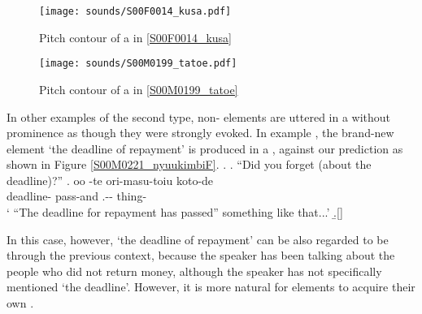 \begin{figure}
	\begin{center}
	\texttt{[image: sounds/S00F0014\_kusa.pdf]}
	\caption{Pitch contour of a in \ref{S00F0014_kusa}}
	\label{S00F0014_kusaF}
	\end{center}
\end{figure}
\begin{figure}
	\begin{center}
	\texttt{[image: sounds/S00M0199\_tatoe.pdf]}
	\caption{Pitch contour of a in \ref{S00M0199_tatoe}}
	\label{S00M0199_tatoeF}
	\end{center}
\end{figure}
%
In other examples of the second type,
non- elements are uttered in a  without prominence
as though they were strongly evoked.
In example \Next,
the brand-new element  `the deadline of repayment' is produced in a , against our prediction
as shown in Figure \ref{S00M0221_nyuukimbiF}.
%
\ex.\label{S00M0221_nyuukimbi}
 \a. ``Did you forget (about the deadline)?''
 \bg. oo \tp{\dvline}  \tp{\dvline} -te ori-masu-toiu koto-de \tp{\dvline} \\
       {} deadline- {} pass-and .-- thing- \\
      ` ``The deadline for repayment has passed'' something like that...'
  \b.[] 

In this case, however,
 `the deadline of repayment' can be also regarded to be  through the previous context,
because the speaker has been talking about the people who did not return money,
although the speaker has not specifically mentioned  `the deadline'.
However, it is more natural for  elements
to acquire their own .


